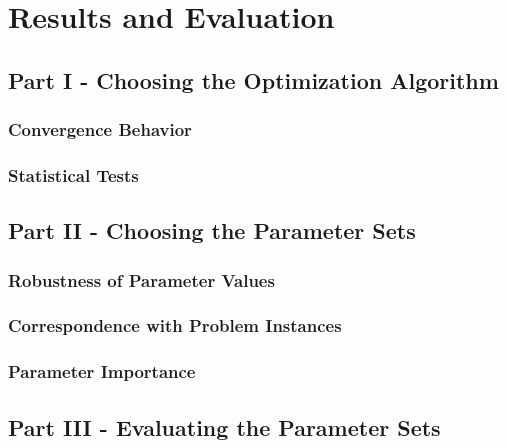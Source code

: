 

\chapter{Results and Evaluation}
\label{chap:results}

\section{Part I - Choosing the Optimization Algorithm}

\subsection{Convergence Behavior}

\subsection{Statistical Tests}


\section{Part II - Choosing the Parameter Sets}

\subsection{Robustness of Parameter Values}

\subsection{Correspondence with Problem Instances}

\subsection{Parameter Importance}


\section{Part III - Evaluating the Parameter Sets}
